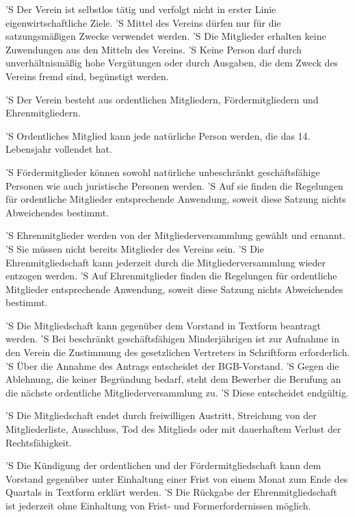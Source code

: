 \documentclass[a4paper,10pt]{scrreprt}
\begin{document}
\begin{contract}
'S Der Verein ist selbstlos tätig und verfolgt nicht in erster Linie
eigenwirtschaftliche Ziele.
'S Mittel des Vereins dürfen nur für die satzungsmäßigen Zwecke verwendet
werden.
'S Die Mitglieder erhalten keine Zuwendungen aus den Mitteln des Vereins.
'S Keine Person darf durch unverhältnismäßig hohe Vergütungen oder durch
Ausgaben, die dem Zweck des Vereins fremd sind, begünstigt werden.


'S Der Verein besteht aus ordentlichen Mitgliedern, Fördermitgliedern und
Ehrenmitgliedern.

'S Ordentliches Mitglied kann jede natürliche Person werden, die das 14.
Lebensjahr vollendet hat.

'S Fördermitglieder können sowohl natürliche unbeschränkt geschäftsfähige
Personen wie auch juristische Personen werden.
'S Auf sie finden die Regelungen für ordentliche Mitglieder entsprechende
Anwendung, soweit diese Satzung nichts Abweichendes bestimmt.

'S Ehrenmitglieder werden von der Mitgliederversammlung gewählt und ernannt.
'S Sie müssen nicht bereits Mitglieder des Vereins sein.
'S Die Ehrenmitgliedschaft kann jederzeit durch die Mitgliederversammlung
wieder entzogen werden.
'S Auf Ehrenmitglieder finden die Regelungen für ordentliche Mitglieder
entsprechende Anwendung, soweit diese Satzung nichts Abweichendes bestimmt.


'S Die Mitgliedschaft kann gegenüber dem Vorstand in Textform beantragt werden.
'S Bei beschränkt geschäftsfähigen Minderjährigen ist zur Aufnahme in den
Verein die Zustimmung des gesetzlichen Vertreters in Schriftform erforderlich.
'S Über die Annahme des Antrags entscheidet der BGB-Vorstand.
'S Gegen die Ablehnung, die keiner Begründung bedarf, steht dem Bewerber die
Berufung an die nächste ordentliche Mitgliederversammlung zu.
'S Diese entscheidet endgültig.

'S Die Mitgliedschaft endet durch freiwilligen Austritt, Streichung von der
Mitgliederliste, Ausschluss, Tod des Mitglieds oder mit dauerhaftem Verlust der
Rechtsfähigkeit.

'S Die Kündigung der ordentlichen und der Fördermitgliedschaft kann dem
Vorstand gegenüber unter Einhaltung einer Frist von einem Monat zum Ende des
Quartals in Textform erklärt werden.
'S Die Rückgabe der Ehrenmitgliedschaft ist jederzeit ohne Einhaltung von
Frist- und Formerfordernissen möglich.


\end{contract}
\end{document}
